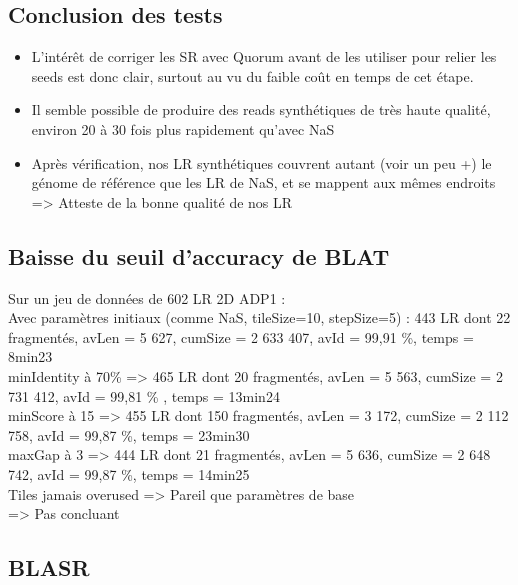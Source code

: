 \documentclass[12pt]{article}
\begin{document}
\subsection{Conclusion des tests}

\begin{itemize}
	\item L'intérêt de corriger les SR avec Quorum avant de les utiliser pour relier les seeds est donc clair, surtout au vu du faible coût 
		  en temps de cet étape.
		  
	\item Il semble possible de produire des reads synthétiques de très haute qualité, environ 20 à 30 fois plus rapidement
		  qu'avec NaS
		  
	\item Après vérification, nos LR synthétiques couvrent autant (voir un peu +) le génome de référence que les LR de NaS,
		  et se mappent aux mêmes endroits => Atteste de la bonne qualité de nos LR
\end{itemize}

\subsection{Baisse du seuil d'accuracy de BLAT}

Sur un jeu de données de 602 LR 2D ADP1 : \\

Avec paramètres initiaux (comme NaS, tileSize=10, stepSize=5) : 443 LR dont 22 fragmentés, avLen = 5 627, cumSize = 2 633 407, avId = 99,91 \%, temps = 8min23 \\

minIdentity à 70\% => 465 LR dont 20 fragmentés, avLen = 5 563, cumSize = 2 731 412, avId =  99,81 \% , temps = 13min24 \\

minScore à 15 => 455 LR dont 150 fragmentés, avLen = 3 172, cumSize = 2 112 758, avId = 99,87 \%, temps = 23min30 \\

maxGap à 3 => 444 LR dont 21 fragmentés, avLen = 5 636, cumSize = 2 648 742, avId = 99,87 \%, temps = 14min25 \\

Tiles jamais overused => Pareil que paramètres de base \\

=> Pas concluant

\subsection{BLASR}
\end{document}
